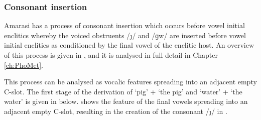 \subsubsection{Consonant insertion}\label{sec:EmpCSloConIns}
Amarasi has a process of consonant insertion
which occurs before vowel initial enclitics
whereby the voiced obstruents /\j/ and /ɡw/ are inserted
before vowel initial enclitics as conditioned
by the final vowel of the enclitic host.
An overview of this process is given in ,
and it is analysed in full detail in Chapter \ref{ch:PhoMet}.

This process can be analysed as vocalic features spreading into an adjacent empty C-slot.
The first stage of the derivation of  `pig' +
 {\ee} {\ra}  `the pig'
and  `water' +  {\ee} {\ra}  `the water'
is given in  below.
 shows the feature  of
the final vowels spreading into an adjacent empty C-slot,
resulting in the creation of the consonant /\j/ in .

